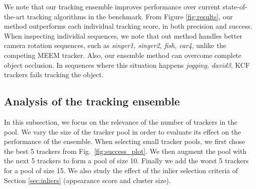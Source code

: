 We note that our tracking ensemble improves performance over current
state-of-the-art tracking algorithms in the benchmark.
From Figure \ref{fig:results}, our method outperforms each individual tracking
score, in both precision and success.
When inspecting individial sequences, we note that 
out method handles better camera
rotation sequences, such as \textit{singer1, singer2, fish, car4}, unlike
the competing
MEEM tracker. Also, our ensemble method can overcome complete object occlusion. In
sequences where this situation happens \textit{jogging, david3}, KCF trackers
fails tracking the object. 


\subsection{Analysis of the tracking ensemble}
In this subsection, we focus on the relevance of the number of trackers in the pool.
We vary the size of the tracker pool in order to evaluate its effect on the
performance of the ensemble.
When selecting small tracker pools, we first chose the best 5 trackers
from Fig.~\ref{fig:success_plot}. We then augment the pool with the next 5 trackers to
form a pool of size 10. Finally we add the worst 5 trackers for a pool of size 15.
We also study the effect of the inlier selection criteria of Section
\ref{sec:inliers}
(appearance score and cluster size).


